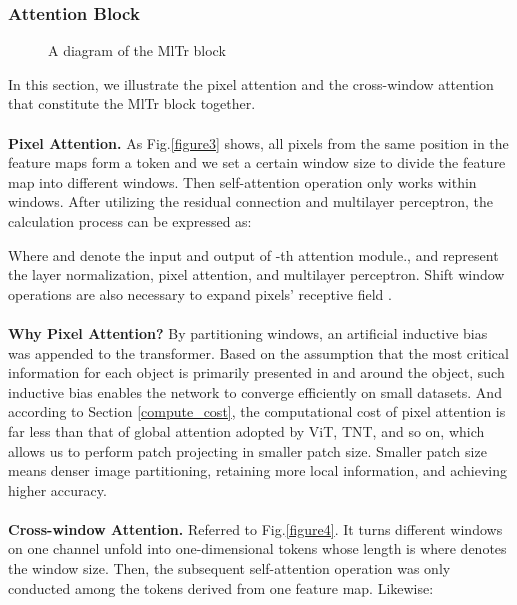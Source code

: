 \documentclass{article} \usepackage[numbers,sort&compress]{natbib}
\begin{document}
\subsubsection{Attention Block}
\begin{figure*}[h]

\begin{center}
\end{center}
\caption{A diagram of the MlTr block}
\end{figure*}
In this section, we illustrate the pixel attention and the cross-window attention that constitute the MlTr block together.\\\\
\textbf{Pixel Attention.} As Fig.\textcolor{red}{\ref{figure3}} shows, all pixels from the same position in the feature maps form a token and we set a certain window size to divide the feature map into different windows. Then self-attention \cite{vaswani2017attention} operation only works within windows. After utilizing the residual connection and multilayer perceptron, the calculation process can be expressed as:

Where  and  denote the input and output of -th attention module., and  represent the layer normalization, pixel attention, and multilayer perceptron. Shift window operations are also necessary to expand pixels' receptive field \cite{liu2021swin}.\\\\
\textbf{Why Pixel Attention?} By partitioning windows, an artificial inductive bias was appended to the transformer. Based on the assumption that the most critical information for each object is primarily presented in and around the object, such inductive bias enables the network to converge efficiently on small datasets. And according to Section \ref{compute_cost}, the computational cost of pixel attention is far less than that of global attention adopted by ViT, TNT, and so on, which allows us to perform patch projecting in smaller patch size. Smaller patch size 
means denser image partitioning, retaining more local information, and achieving higher accuracy.\\\\
\textbf{Cross-window Attention.} Referred to Fig.\textcolor{red}{\ref{figure4}}. It turns different windows on one channel unfold into one-dimensional tokens whose length is  where  denotes the window size. Then, the subsequent self-attention operation was only conducted among the tokens derived from one feature map. Likewise:
\end{document}
